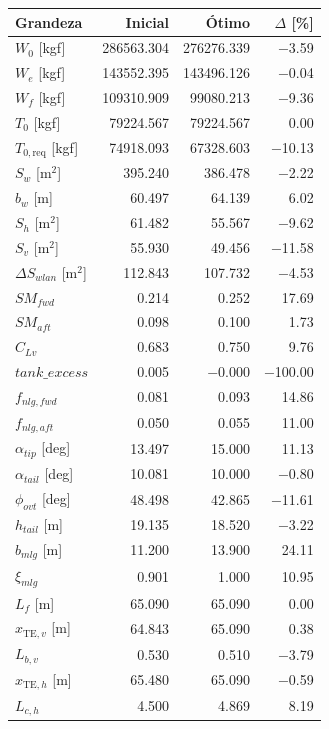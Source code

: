 \begin{tabular}{lrrr}
\toprule
Grandeza & Inicial & Ótimo & $\Delta$ [\%] \\
\midrule
$W_0$ [kgf] & 286563.304 & 276276.339 & $-$3.59 \\
$W_e$ [kgf] & 143552.395 & 143496.126 & $-$0.04 \\
$W_f$ [kgf] & 109310.909 & 99080.213 & $-$9.36 \\
$T_0$ [kgf] & 79224.567 & 79224.567 & 0.00 \\
$T_{0,\mathrm{req}}$ [kgf] & 74918.093 & 67328.603 & $-$10.13 \\
$S_w$ [m$^2$] & 395.240 & 386.478 & $-$2.22 \\
$b_w$ [m] & 60.497 & 64.139 & 6.02 \\
$S_h$ [m$^2$] & 61.482 & 55.567 & $-$9.62 \\
$S_v$ [m$^2$] & 55.930 & 49.456 & $-$11.58 \\
$\Delta S_{wlan}$ [m$^2$] & 112.843 & 107.732 & $-$4.53 \\
$SM_{fwd}$ & 0.214 & 0.252 & 17.69 \\
$SM_{aft}$ & 0.098 & 0.100 & 1.73 \\
$C_{Lv}$ & 0.683 & 0.750 & 9.76 \\
$tank\_excess$ & 0.005 & $-$0.000 & $-$100.00 \\
$f_{nlg,fwd}$ & 0.081 & 0.093 & 14.86 \\
$f_{nlg,aft}$ & 0.050 & 0.055 & 11.00 \\
$\alpha_{tip}$ [deg] & 13.497 & 15.000 & 11.13 \\
$\alpha_{tail}$ [deg] & 10.081 & 10.000 & $-$0.80 \\
$\phi_{ovt}$ [deg] & 48.498 & 42.865 & $-$11.61 \\
$h_{tail}$ [m] & 19.135 & 18.520 & $-$3.22 \\
$b_{mlg}$ [m] & 11.200 & 13.900 & 24.11 \\
$\xi_{mlg}$ & 0.901 & 1.000 & 10.95 \\
$L_f$ [m] & 65.090 & 65.090 & 0.00 \\
$x_{\mathrm{TE},v}$ [m] & 64.843 & 65.090 & 0.38 \\
$L_{b,v}$ & 0.530 & 0.510 & $-$3.79 \\
$x_{\mathrm{TE},h}$ [m] & 65.480 & 65.090 & $-$0.59 \\
$L_{c,h}$ & 4.500 & 4.869 & 8.19 \\
\bottomrule
\end{tabular}